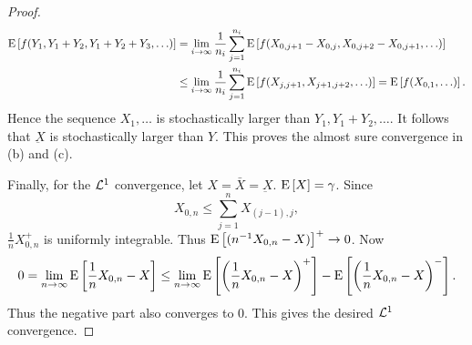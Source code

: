\begin{proof}
    \begin{equation*}
        \begin{split}
            \operatorname{E}\left[ {f(Y_1, Y_1+Y_2,Y_1+Y_2+Y_3,\ldots)} \right] 
            &= \lim_{i\to\infty}\frac{1}{n_i}\sum_{j=1}^{n_i}\operatorname{E}\left[ {f(X_{0,j+1}-X_{0,j}, X_{0,j+2} - X_{0,j+1},\ldots)} \right] \\ 
            &\leq \lim_{i\to\infty}\frac{1}{n_i}\sum_{j=1}^{n_i}\operatorname{E}\left[ {f(X_{j,j+1}, X_{j+1,j+2},\ldots)} \right] 
            = \operatorname{E}\left[ {f(X_{0,1},\ldots)} \right]. 
        \end{split}
    \end{equation*}
    Hence the sequence $X_1,\ldots$ is stochastically larger 
    than $Y_1,Y_1+Y_2,\ldots$. It follows that $\underbar{X}$ 
    is stochastically larger than $Y$. This proves the almost sure 
    convergence in (b) and (c).

    Finally, for the $\mathcal{L}^1$ convergence, let $X = \bar{X} = \underbar{X}$. 
    $\operatorname{E}\left[ {X} \right] = \gamma$. Since 
    \begin{equation*}
        X_{0,n}\leq \sum_{j=1}^nX_{(j-1),j}, 
    \end{equation*}
    $\frac{1}{n}X_{0,n}^+$ is uniformly integrable. Thus 
    $\operatorname{E}\left[ {(n^{-1}X_{0,n}-X)} \right]^+\to 0$. Now 
    \begin{equation*}
        0 = \lim_{n\to\infty}\E\sbrc{\frac{1}{n}X_{0,n}-X}\leq \lim_{n\to\infty}\E\sbrc{\pth{\frac{1}{n}X_{0,n}-X}^+} - \E\sbrc{\pth{\frac{1}{n}X_{0,n}-X}^-}.
    \end{equation*}
    Thus the negative part also converges to $0$. This gives the 
    desired $\mathcal{L}^1$ convergence. 
\end{proof}